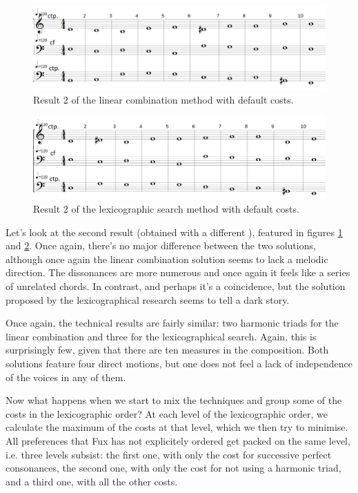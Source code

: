 \begin{figure}[h]
    \centering
    \includegraphics[width=1\textwidth]{Images/Experiments/linear-combination-1sp0.png}
    \caption{Result 2 of the linear combination method with default costs.}
    \label{fig:combili-1sp0}
\end{figure}

\begin{figure}[h]
    \centering
    \includegraphics[width=1\textwidth]{Images/Experiments/basic-lexico-1sp0.png}
    \caption{Result 2 of the lexicographic search method with default costs.}
    \label{fig:lexico-1sp0}
\end{figure}

Let's look at the second result (obtained with a different \cf), featured in figures \ref{fig:combili-1sp0} and \ref{fig:lexico-1sp0}. Once again, there's no major difference between the two solutions, although once again the linear combination solution seems to lack a melodic direction. The dissonances are more numerous and once again it feels like a series of unrelated chords. In contrast, and perhaps it's a coincidence, but the solution proposed by the lexicographical research seems to tell a dark story.

Once again, the technical results are fairly similar: two harmonic triads for the linear combination and three for the lexicographical search. Again, this is surprisingly few, given that there are ten measures in the composition. Both solutions feature four direct motions, but one does not feel a lack of independence of the voices in any of them.

Now what happens when we start to mix the techniques and group some of the costs in the lexicographic order? At each level of the lexicographic order, we calculate the maximum of the costs at that level, which we then try to minimise. All preferences that Fux has not explicitely ordered get packed on the same level, i.e. three levels subsist: the first one, with only the cost for successive perfect consonances, the second one, with only the cost for not using a harmonic triad, and a third one, with all the other costs.

